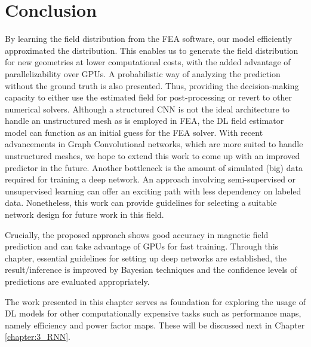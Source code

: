\section{Conclusion}
By learning the field distribution from the FEA software, our model efficiently approximated the distribution. This enables us to generate the field distribution for new geometries at lower computational costs, with the added advantage of parallelizability over GPUs. A probabilistic way of analyzing the prediction without the ground truth is also presented. Thus, providing the decision-making capacity to either use the estimated field for post-processing or revert to other numerical solvers.
Although a structured CNN is not the ideal architecture to handle an unstructured mesh as is employed in FEA, the DL field estimator model can function as an initial guess for the FEA solver. With recent advancements in Graph Convolutional networks, which are more suited to handle unstructured meshes, we hope to extend this work to come up with an improved predictor in the future. Another bottleneck is the amount of simulated (big) data required for training a deep network. An approach involving semi-supervised or unsupervised learning can offer an exciting path with less dependency on labeled data. Nonetheless, this work can provide guidelines for selecting a suitable network design for future work in this field. 


 Crucially, the proposed approach shows good accuracy in magnetic field prediction and can take advantage of GPUs for fast training. Through this chapter, essential guidelines for setting up deep networks are established, the result/inference is improved by Bayesian techniques and the confidence levels of predictions are evaluated appropriately. 
 
 The work presented in this chapter serves as foundation for exploring the usage of DL models for other computationally expensive tasks such as performance maps, namely efficiency and power factor maps. These will be discussed next in Chapter \ref{chapter:3_RNN}.
 
 

 